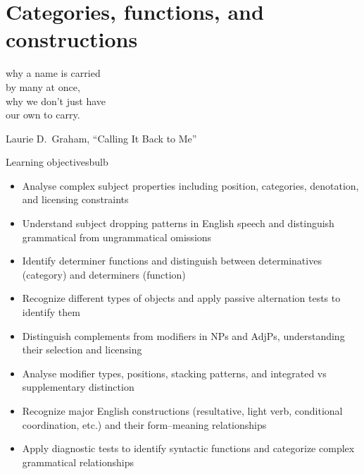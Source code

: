 \chapter{Categories, functions, and constructions}


\epigraph{why a name is carried\\
by many at once,\\[0.5em]
why we don't just have\\
our own to carry.}{Laurie D.\ Graham, \enquote{Calling It Back to Me}}

\begin{tblsframedsymbol}{Learning objectives}{bulb}
\begin{itemize}[noitemsep, leftmargin=*]
    \item Analyse complex subject properties including position, categories, denotation, and licensing constraints
    \item Understand subject dropping patterns in English speech and distinguish grammatical from ungrammatical omissions
    \item Identify determiner functions and distinguish between determinatives (category) and determiners (function)
    \item Recognize different types of objects and apply passive alternation tests to identify them
    \item Distinguish complements from modifiers in NPs and AdjPs, understanding their selection and licensing
    \item Analyse modifier types, positions, stacking patterns, and integrated vs supplementary distinction
    \item Recognize major English constructions (resultative, light verb, conditional coordination, etc.) and their form--meaning relationships
    \item Apply diagnostic tests to identify syntactic functions and categorize complex grammatical relationships
\end{itemize}
\end{tblsframedsymbol}

